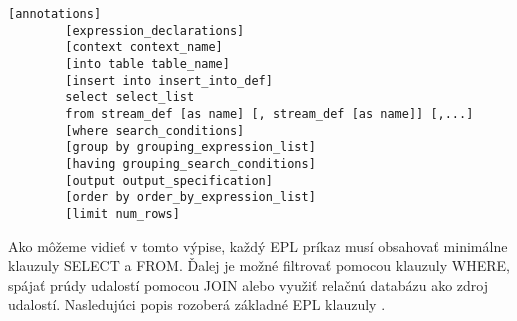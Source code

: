 		\begin{lstlisting}[label=lst:epl-syntax,caption=Vzor EPL syntaxe \cite{web:esper-doc}]
		[annotations]
		[expression_declarations]
		[context context_name]
		[into table table_name]
		[insert into insert_into_def]
		select select_list
		from stream_def [as name] [, stream_def [as name]] [,...]
		[where search_conditions]
		[group by grouping_expression_list]
		[having grouping_search_conditions]
		[output output_specification]
		[order by order_by_expression_list]
		[limit num_rows]
		\end{lstlisting}

		Ako môžeme vidieť v tomto výpise, každý EPL príkaz musí obsahovať minimálne klauzuly SELECT a FROM. Ďalej je možné filtrovať pomocou klauzuly WHERE, spájať prúdy udalostí pomocou JOIN alebo využiť relačnú databázu ako zdroj udalostí. Nasledujúci popis rozoberá základné EPL klauzuly \cite{web:esper-doc}.
		
